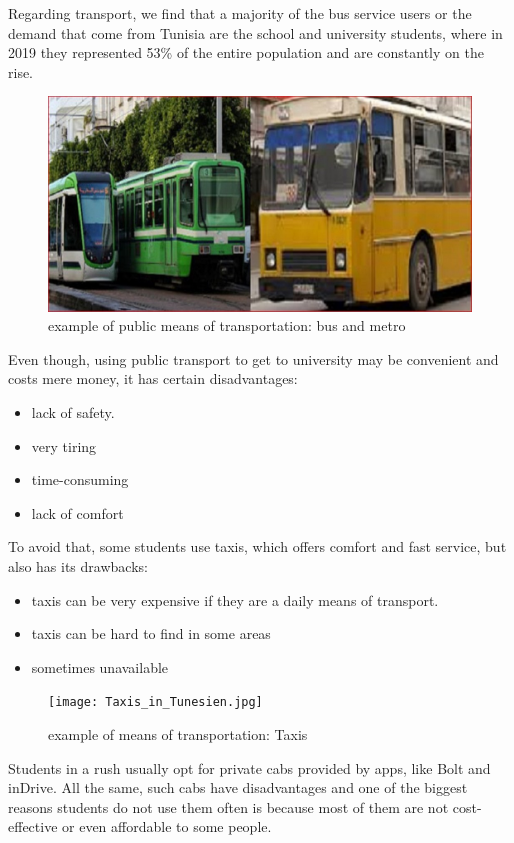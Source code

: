 Regarding transport, we find that a majority of the bus service users or the demand that come from Tunisia are the school and university students, where in 2019 they represented 53\% of the entire population and are constantly on the rise. \cite{Share_of_students_in_total_bus_passengers}
\begin{figure}[H] 
            \centering
            \includegraphics[scale=0.3]{bus-metro-tunis.jpeg}
            \caption{example of public means of transportation: bus and metro} 
            \label{fig: example of means of transportation}
\end{figure}
Even though, using public transport to get to university may be convenient and costs mere money, it has certain disadvantages:
\begin{itemize}
    \item lack of safety.
    \item very tiring
    \item time-consuming
    \item lack of comfort
\end{itemize}
To avoid that, some students use taxis, which offers comfort and fast service, but also has its drawbacks: 
\begin{itemize}
    \item taxis can be very expensive if they are a daily means of transport.
    \item taxis can be hard to find in some areas
    \item sometimes unavailable
\end{itemize}
\begin{figure}[H] 
            \centering
            \texttt{[image: Taxis\_in\_Tunesien.jpg]}
            \caption{example of means of transportation: Taxis} 
            \label{fig: example of means of transportation 2}
\end{figure}
Students in a rush usually opt for private cabs provided by apps, like Bolt and inDrive. All the same, such cabs have disadvantages and one of the biggest reasons students do not use them often is because most of them are not cost-effective or even affordable to some people.
